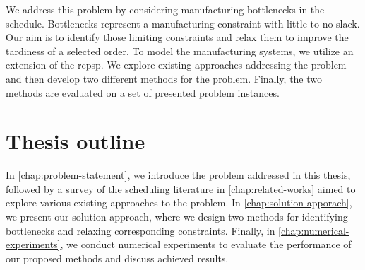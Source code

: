
We address this problem by considering manufacturing bottlenecks in the schedule.
Bottlenecks represent a manufacturing constraint with little to no slack.
Our aim is to identify those limiting constraints
and relax them to improve the tardiness of a selected order.
To model the manufacturing systems, we utilize an extension of the \acf{rcpsp}.
We explore existing approaches addressing the problem
and then develop two different methods for the problem.
Finally, the two methods are evaluated on a set of presented problem instances.

\section*{Thesis outline} \label{sec:introduction/thesis-outline}

In \cref{chap:problem-statement}, we introduce the problem addressed in this thesis,
followed by a survey of the scheduling literature in \cref{chap:related-works}
aimed to explore various existing approaches to the problem.
In \cref{chap:solution-apporach}, we present our solution approach,
where we design two methods for identifying bottlenecks and relaxing corresponding constraints.
Finally, in \cref{chap:numerical-experiments}, we conduct numerical experiments to evaluate the performance
of our proposed methods and discuss achieved results.
